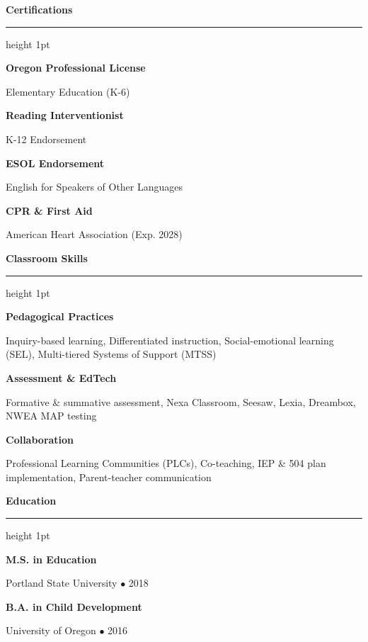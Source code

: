 \documentclass[10pt,letterpaper]{article}
\newcommand{\sectiontitle}[1]{%
  \vspace{0.25cm}%
  {\large\bfseries\color{accent} #1}%
  \par\vspace{-0.1cm}%
  {\color{linecolor}\hrule height 1pt}%
  \par\vspace{0.2cm}%
}
\newcommand{\certitem}[2]{%
  {\raggedright\textbf{\color{dark}#1}\par}%
  {\raggedright{\color{light}\small #2}\par}%
  \vspace{0.15cm}%
}
\newcommand{\skillcategory}[2]{%
  {\raggedright\textbf{\color{dark}#1}\par}%
  {\raggedright{\small\color{dark} #2}\par}%
  \vspace{0.18cm}%
}
\newcommand{\eduitem}[3]{%
  {\raggedright\textbf{\color{dark}#1}\par}%
  {\raggedright{\color{light}\small #2 $\bullet$ #3}\par}%
  \vspace{0.15cm}%
}
\begin{document}
\begin{minipage}[t]{0.30\linewidth}
  \sectiontitle{Certifications}
  \certitem{Oregon Professional License}{Elementary Education (K-6)}
  \certitem{Reading Interventionist}{K-12 Endorsement}
  \certitem{ESOL Endorsement}{English for Speakers of Other Languages}
  \certitem{CPR \& First Aid}{American Heart Association (Exp. 2028)}

  \sectiontitle{Classroom Skills}
  \skillcategory{Pedagogical Practices}{Inquiry-based learning, Differentiated instruction, Social-emotional learning (SEL), Multi-tiered Systems of Support (MTSS)}
  \skillcategory{Assessment \& EdTech}{Formative \& summative assessment, Nexa Classroom, Seesaw, Lexia, Dreambox, NWEA MAP testing}
  \skillcategory{Collaboration}{Professional Learning Communities (PLCs), Co-teaching, IEP \& 504 plan implementation, Parent-teacher communication}

  \sectiontitle{Education}
  \eduitem{M.S. in Education}{Portland State University}{2018}
  \eduitem{B.A. in Child Development}{University of Oregon}{2016}
\end{minipage}%
\hfill
\end{document}
